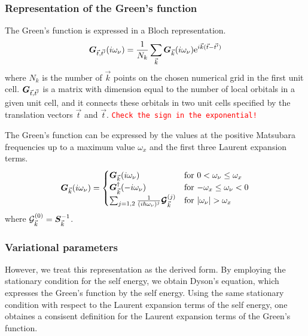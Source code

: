 \documentclass[11pt,a4paper]{report}
\newcommand{\petertt}[1]{\textcolor{red}{\texttt{#1}}}
\begin{document}
\subsubsection{Representation of the Green's function}
The Green's function is expressed in a Bloch representation.
\begin{eqnarray}
\bm{G}_{\vec{t},\vec{t'}}(i\omega_\nu)=\frac{1}{N_k}\sum_{\vec{k}}
\bm{G}_{\vec{k}}(i\omega_\nu)\mathrm{e}^{i\vec{k}(\vec{t}-\vec{t'})}
\end{eqnarray}
where $N_k$ is the number of $\vec{k}$ points on the chosen numerical
grid in the first unit cell.  $\bm{G}_{\vec{t},\vec{t'}}$ is a matrix
with dimension equal to the number of local orbitals in a given unit
cell, and it connects these orbitals in two unit cells specified by
the translation vectors $\vec{t}$ and $\vec{t}$.  \petertt{Check the
  sign in the exponential!}


The Green's function can be expressed by the values at the positive
Matsubara frequencies up to a maximum value $\omega_x$ and the first
three Laurent expansion terms.
\begin{eqnarray}
\mat{G}_{\vec{k}}(i\omega_\nu)=
\begin{cases}
\mat{G}_{\vec{k}}(i\omega_\nu)
&\text{for $0<\omega_\nu\le\omega_x$}\\
\mat{G}_{\vec{k}}^\dagger(-i\omega_\nu)
&\text{for $-\omega_x\le\omega_\nu<0$}\\
\sum_{j=1,2}\frac{1}{(i\hbar\omega_\nu)^j}
\mat{\mathcal{G}}^{(j)}_{\vec{k}}
&\text{for $|\omega_\nu|>\omega_x$}\\
\end{cases}
\label{eq:Greensfunctionrep}
\end{eqnarray}
where $\mathcal{\bm{G}}^{(0)}_{\vec{k}}=\bm{S}_{\vec{k}}^{-1}$.


\subsubsection{Variational parameters}
However, we treat this representation as the derived form.  By
employing the stationary condition for the self energy, we obtain
Dyson's equation, which expresses the Green's function by the self
energy. Using the same stationary condition with respect to the
Laurent expansion terms of the self energy, one obtaines a consisent
definition for the Laurent expansion terms of the Green's function.
\end{document}
